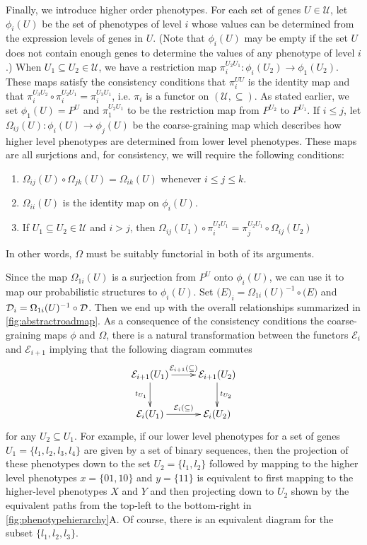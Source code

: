 Finally, we introduce higher order phenotypes.  For each set of genes $U \in \mathcal{U}$, let $\phi_i (U)$ be the set of phenotypes of level $i$ whose values can be determined from the expression levels of genes in $U$.  (Note that $\phi_i (U)$ may be empty if the set $U$ does not contain enough genes to determine the values of any phenotype of level $i$.)  When $U_1 \subseteq U_2 \in \mathcal{U}$, we have a restriction map $\pi_i^{U_2 U_1} \colon \phi_i(U_2) \to \phi_1(U_2)$.  These maps satisfy the consistency conditions that $\pi_i^{UU}$ is the identity map and that $\pi_i^{U_3 U_2} \circ \pi_i^{U_2 U_1} = \pi_i^{U_3 U_1}$, i.e. $\pi_i$ is a functor on $(\mathcal{U}, \subseteq)$.  As stated earlier, we set $\phi_1 (U) = P^U$ and $\pi_1^{U_2 U_1}$ to be the restriction map from $P^{U_2}$ to $P^{U_1}$.  If $i \le j$, let $\Omega_{ij}(U) : \phi_i(U) \to \phi_j(U)$ be the coarse-graining map which describes how higher level phenotypes are determined from lower level phenotypes.  These maps are all surjctions and, for consistency, we will require the following conditions:
\begin{enumerate}
\item $\Omega_{ij}(U) \circ \Omega_{jk}(U) = \Omega_{ik}(U)$ whenever $i \le j \le k$.
\item $\Omega_{ii}(U)$ is the identity map on $\phi_i (U)$.
\item If $U_1 \subseteq U_2 \in \mathcal{U}$ and $i > j$, then $\Omega_{ij}(U_1) \circ \pi_i^{U_2 U_1} = \pi_j^{U_2 U_1} \circ \Omega_{ij}(U_2)$
\end{enumerate}
In other words, $\Omega$ must be suitably functorial in both of its arguments.

Since the map $\Omega_{1i}(U)$ is a surjection from $P^U$ onto $\phi_i(U)$, we can use it to map our probabilistic structures to $\phi_i(U)$.  Set $\mathcal(E)_i = \Omega_{1i}(U)^{-1} \circ \mathcal(E)$ and $\mathcal{D}_i = \Omega_{1i}(U)^{-1} \circ \mathcal{D}$.  Then we end up with the overall relationships summarized in \ref{fig:abstractroadmap}. As a consequence of the consistency conditions the coarse-graining maps $\phi$ and $\Omega$, there is a natural transformation between the functors $\mathcal{E}_i$ and $\mathcal{E}_{i+1}$ implying that the following diagram commutes
$$
\xymatrix{
\mathcal{E}_{i+1}(U_1) \ar[r]^{\mathcal{E}_{i+1}(\subseteq)} \ar[d]_{t_{U_1}} & \mathcal{E}_{i+1}(U_2) \ar[d]^{t_{U_2}} \\
\mathcal{E}_{i}(U_1) \ar[r]^{\mathcal{E}_{i}(\subseteq)} & \mathcal{E}_{i}(U_2) }
$$
for any $U_2 \subseteq U_1$. For example, if our lower level phenotypes for a set of genes $U_1 = \{ l_1,l_2,l_3,l_4 \}$ are given by a set of binary sequences, then the projection of these phenotypes down to the set $U_2 = \{l_1,l_2\}$ followed by mapping to the higher level phenotypes $x=\{01,10\}$ and $y=\{11\}$ is equivalent to first mapping to the higher-level phenotypes $X$ and $Y$ and then projecting down to $U_2$ shown by the equivalent paths from the top-left to the bottom-right in \ref{fig:phenotypehierarchy}A.
Of course, there is an equivalent diagram for the subset $\{ l_1,l_2,l_3 \}$.

